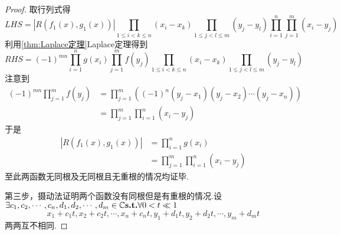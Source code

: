 {\begin{proof}
        取行列式得
        \[
            LHS = \left|
            R \left(
            f_1\left(x\right),g_1\left(x\right)
            \right)
            \right|\prod_{1\leqslant i<k\leqslant n}\left(
            x_i-x_k
            \right)\prod_{1\leqslant j<l\leqslant m}\left(
            y_j-y_l
            \right)
            \prod_{i=1}^{n}\prod_{j=1}^{m}\left(
            x_i-y_j
            \right)
        \]
        利用\cref{thm:Laplace定理}Laplace定理得到
        \[
            RHS=\left(-1\right)^{mn}\prod_{i=1}^{n}
            g\left(x_i\right)\prod_{j=1}^{m}f\left(y_j\right)\prod_{1\leqslant i<k\leqslant n}\left(
            x_i-x_k
            \right)\prod_{1\leqslant j<l\leqslant m}\left(
            y_j-y_l
            \right)
        \]
        注意到
        \begin{align*}
            \left(-1\right)^{mn}\prod_{j=1}^{m}f\left(y_j\right) & =\prod_{j=1}^{m}\left(
            \left(-1\right)^n\left(y_j-x_1\right)\left(y_j-x_2\right)\cdots\left(y_j-x_n\right)
            \right)                                                                                      \\
                                                                 & =\prod_{j=1}^{m}\prod_{i=1}^{n}\left(
            x_i-y_j
            \right)
        \end{align*}
        于是
        \begin{align*}
            \left|
            R\left(f_1\left(x\right),g_1\left(x\right)\right)
            \right| & =\prod_{i=1}^{n}g\left(x_i\right) \\
                    & =
            \prod_{j=1}^{m}\prod_{i=1}^{n}\left(
            x_i-y_j
            \right)
        \end{align*}至此两函数无同根及无同根且无重根的情况均证毕.

        第三步，摄动法证明两个函数没有同根但是有重根的情况.设$\exists c_1,c_2,\cdots,c_n,d_1,d_2,\cdots,d_m\in\mathbb{C} \textup{\bfseries{s.t.}}\forall 0<t\ll 1$\[x_1+c_1t,x_2+c_2t,\cdots,x_n+c_nt,y_1+d_1t,y_2+d_2t,\cdots,y_m+d_mt\]两两互不相同.


\end{proof}}

